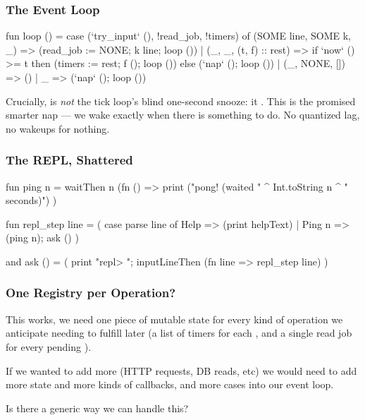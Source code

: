\documentclass[aspectratio=169]{beamer}
\begin{document}
\begin{frame}[fragile]
  \frametitle{The Event Loop}

  {\small
  \begin{codeblock}
    fun loop () =
      case (`try_input` (), !read_job, !timers) of
          (SOME line, SOME k, _) =>
            (read_job := NONE; k line; loop ())
        | (_, _, (t, f) :: rest) =>
            if `now` () >= t
            then (timers := rest; f (); loop ())
            else (`nap` (); loop ())
        | (_, NONE, []) => ()
        | _ => (`nap` (); loop ())
\end{codeblock}
  }

  \pause
  \vspace{\fill}

  Crucially,  is \textit{not} the tick loop's blind
  one-second snooze: it . This is the promised
  smarter nap --- we wake exactly when there is something to do. No
  quantized lag, no wakeups for nothing.
\end{frame}

\begin{frame}[fragile]
  \frametitle{The REPL, Shattered}

  {\small
  \begin{codeblock}
    fun ping n =
      waitThen n (fn () =>
        print ("pong! (waited " ^ Int.toString n ^ " seconds)")
      )

    fun repl_step line =
      ( case parse line of
          Help => (print helpText)
        | Ping n => (ping n);
        ask ()
      )

    and ask () =
      ( print "repl> ";
        inputLineThen (fn line => repl_step line)
      )
\end{codeblock}
  }
\end{frame}

\begin{frame}[fragile]
  \frametitle{One Registry per Operation?}

  This works, we need one piece of mutable state for every kind of operation
  we anticipate needing to fulfill later (a list of timers
  for each , and a single read job for every pending
  ).

  \pause
  \vspace{\fill}

  If we wanted to add more (HTTP requests, DB reads, etc) we would need to
  add more state and more kinds of callbacks, and more cases into our
  event loop.

  \pause
  \vspace{\fill}

  Is there a generic way we can handle this?
\end{frame}
\end{document}
